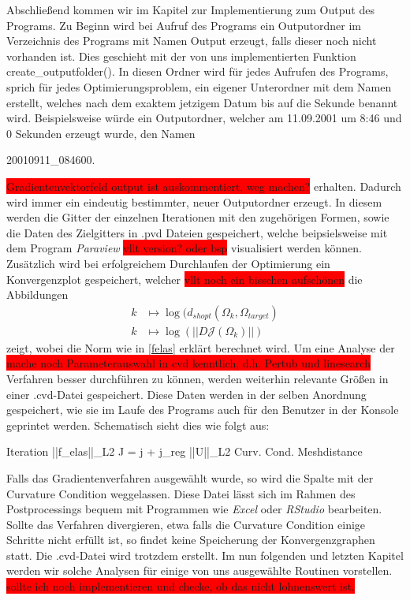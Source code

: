 Abschließend kommen wir im Kapitel zur Implementierung zum Output des Programs.
Zu Beginn wird bei Aufruf des Programs ein Outputordner im Verzeichnis des Programs mit Namen \textsf{Output} erzeugt, falls dieser noch nicht vorhanden ist. Dies geschieht mit der von uns implementierten Funktion \textsf{create\_outputfolder()}. In diesen Ordner wird für jedes Aufrufen des Programs, sprich für jedes Optimierungsproblem, ein eigener Unterordner mit dem Namen erstellt, welches nach dem exaktem jetzigem Datum bis auf die Sekunde benannt wird. Beispielsweise würde ein Outputordner, welcher am 11.09.2001 um 8:46 und 0 Sekunden erzeugt wurde, den Namen 
\begin{center}
\textsf{20010911\_084600}.
\end{center}
\colorbox{red}{Gradientenvektorfeld output ist auskommentiert, weg machen?}
erhalten. Dadurch wird immer ein eindeutig bestimmter, neuer Outputordner erzeugt. In diesem werden die Gitter der einzelnen Iterationen mit den zugehörigen Formen, sowie die Daten des Zielgitters in \textsf{.pvd} Dateien gespeichert, welche beipsielsweise mit dem Program \textit{Paraview} \colorbox{red}{vllt version? oder bsp} visualisiert werden können. Zusätzlich wird bei erfolgreichem Durchlaufen der Optimierung ein Konvergenzplot gespeichert, welcher \colorbox{red}{vllt noch ein bisschen aufschönen} die Abbildungen
\begin{align*}
k &\mapsto \log(d_{shopt}(\Omega_k, \Omega_{target}) \\
k &\mapsto \log(\vert\vert D\mathcal{J}(\Omega_k) \vert\vert)
\end{align*}
zeigt, wobei die Norm wie in \ref{felas} erklärt berechnet wird. Um eine Analyse der \colorbox{red}{mache noch Parameterauswahl in cvd kenntlich, d.h. Pertub und linesearch} Verfahren besser durchführen zu können, werden weiterhin relevante Größen in einer \textsf{.cvd}-Datei gespeichert. Diese Daten werden in der selben Anordnung gespeichert, wie sie im Laufe des Programs auch für den Benutzer in der Konsole geprintet werden. Schematisch sieht dies wie folgt aus:
\begin{center}
\textsf{Iteration \hspace{0.1cm}  ||f\_elas||\_L2 \hspace{0.1cm}  J = j + j\_reg   \hspace{0.1cm} ||U||\_L2 \hspace{0.1cm}  Curv. Cond. \hspace{0.1cm} Meshdistance}
\end{center}

Falls das Gradientenverfahren ausgewählt wurde, so wird die Spalte mit der Curvature Condition weggelassen. Diese Datei lässt sich im Rahmen des Postprocessings bequem mit Programmen wie \textit{Excel} oder \textit{RStudio} bearbeiten. Sollte das Verfahren divergieren, etwa falls die Curvature Condition einige Schritte nicht erfüllt ist, so findet keine Speicherung der Konvergenzgraphen statt. Die \textsf{.cvd}-Datei wird trotzdem erstellt. 
Im nun folgenden und letzten Kapitel werden wir solche Analysen für einige von uns ausgewählte Routinen vorstellen.
 \colorbox{red}{sollte ich noch implementieren und checke, ob das nicht lohnenswert ist.}

\newpage
